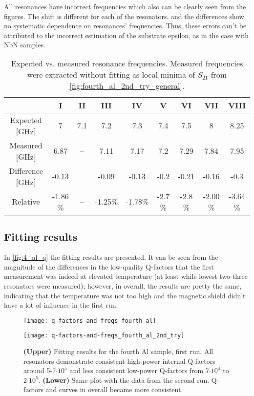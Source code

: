 \documentclass[12pt]{article}
\numberwithin{equation}{section}
\numberwithin{figure}{section}
\begin{document}
All resonances have incorrect frequencies which also can be clearly seen from the figures. The shift is different for each of the resonators, and the differences show no systematic dependence on resonances' frequencies. Thus, these errors can't be attributed to the incorrect estimation of the substrate epsilon, as in the case with NbN samples.

\begin{table}[h]
\centering
\bgroup
\def\arraystretch{1.5}%
\begin{tabular}{c|*{8}{c}}
  & I & II & III & IV & V & VI & VII & VIII \\
\hline
Expected [GHz]& 7 & 7.1 & 7.2 & 7.3 & 7.4 & 7.5 & 8 & 8.25\\
Measured [GHz] & 6.87& -- &  7.11&  7.17&  7.2 &  7.29&  7.84&  7.95 \\
Difference [GHz]& -0.13& -- & -0.09& -0.13& -0.2 & -0.21& -0.16& -0.3 \\
Relative &-1.86 \%& -- & -1.25\%& -1.78\%& -2.7 \%& -2.8 \%& -2.00  \%& -3.64 \%
\end{tabular}
\egroup
\caption{Expected vs. measured resonance frequencies. Measured frequencies were extracted without fitting as local minima of $S_{21}$ from \autoref{fig:fourth_al_2nd_try_general}.}
\label{tab:freqs_third_al}
\end{table}

\subsection{Fitting results}

In \autoref{fig:4_al_q} the fitting results are presented. It can be seen from the magnitude of the differences in the low-quality Q-factors that the first measurement was indeed at elevated temperature (at least while lowest two-three resonators were measured); however, in overall, the results are pretty the same, indicating that the temperature was not too high and the magnetic shield didn't have a lot of influence in the first run.

\begin{figure}[h!]
\centering
\texttt{[image: q-factors-and-freqs\_fourth\_al]}

\vspace{0.5cm}
\texttt{[image: q-factors-and-freqs\_fourth\_al\_2nd\_try]}

\caption{\textbf{(Upper)} Fitting results for the fourth Al sample, first run. All resonators demonstrate consistent high-power internal Q-factors around 5-7$\cdot 10^5$ and less consistent low-power Q-factors from 7$\cdot 10^4$ to 2$\cdot 10^5$. \textbf{(Lower)} Same plot with the data from the second run. Q-factors and curves in overall became more consistent.}
\label{fig:4_al_q}
\end{figure}
\end{document}
